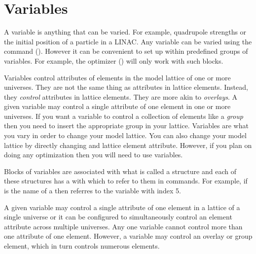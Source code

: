 \section{Variables}
\label{s:variables}


A variable is anything that can be varied. For example, quadrupole
strengths or the initial position of a particle in a LINAC. Any
variable can be varied using the  command
(). However it can be convenient to set up within \tao
predefined groups of variables. For example, the optimizer
() will only work with such blocks.


Variables control attributes of elements in the model lattice of one
or more universes. They are not the same thing as attributes in
lattice elements.  Instead, they \textit{control} attributes in
lattice elements. They are more akin to \bmad \textit{overlays}. A
given variable may control a single attribute of one element in one or
more universes. If you want a variable to control a collection of
elements like a \bmad \textit{group} then you need to insert the
appropriate group in your lattice. Variables are what you vary in
order to change your model lattice. You can also change your model
lattice by directly changing and lattice element attribute. However,
if you plan on doing any optimization then you will need to use
variables.



Blocks of variables are associated with what is called a 
structure and each of these structures has a  with which to
refer to them in \tao commands. For example, if  is the
name of a  then  referres to the variable 
with index 5. 

A given variable may control a single attribute of one element in a
 lattice of a single universe or it can be configured to
simultaneously control an element attribute across multiple
universes. Any one variable cannot control more than one attribute of
one element. However, a variable may control an overlay or group
element, which in turn controls numerous elements.

